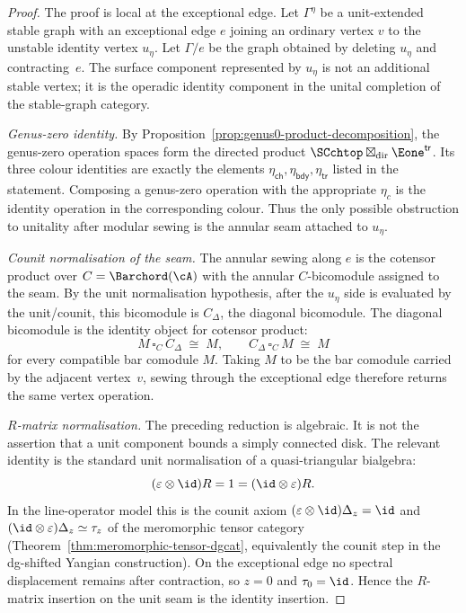 \begin{proof}
The proof is local at the exceptional edge.  Let \(\Gamma^\eta\) be a
unit-extended stable graph with an exceptional edge \(e\) joining an
ordinary vertex \(v\) to the unstable identity vertex \(u_\eta\).
Let \(\Gamma/e\) be the graph obtained by deleting \(u_\eta\) and
contracting~\(e\).  The surface component represented by \(u_\eta\)
is not an additional stable vertex; it is the operadic identity
component in the unital completion of the stable-graph category.

\medskip\noindent
\emph{Genus-zero identity.}
By Proposition~\ref{prop:genus0-product-decomposition}, the
genus-zero operation spaces form the directed product
\(\SCchtop\boxtimes_{\mathrm{dir}}\Eone^{\mathsf{tr}}\).  Its three
colour identities are exactly the elements
\(\eta_{\mathsf{ch}},\eta_{\mathsf{bdy}},\eta_{\mathsf{tr}}\)
listed in the statement.  Composing a genus-zero operation with the
appropriate \(\eta_c\) is the identity operation in the corresponding
colour.  Thus the only possible obstruction to unitality after modular
sewing is the annular seam attached to \(u_\eta\).

\medskip\noindent
\emph{Counit normalisation of the seam.}
The annular sewing along \(e\) is the cotensor product over
\(C=\Barchord(\cA)\) with the annular \(C\)-bicomodule assigned to
the seam.  By the unit normalisation hypothesis, after the \(u_\eta\)
side is evaluated by the unit/counit, this bicomodule is
\(C_\Delta\), the diagonal bicomodule.  The diagonal bicomodule is the
identity object for cotensor product:
\[
 M \,\square_C\, C_\Delta \;\cong\; M,\qquad
 C_\Delta\,\square_C\, M \;\cong\; M
\]
for every compatible bar comodule \(M\).  Taking \(M\) to be the bar
comodule carried by the adjacent vertex~\(v\), sewing through the
exceptional edge therefore returns the same vertex operation.

\medskip\noindent
\emph{\(R\)-matrix normalisation.}
The preceding reduction is algebraic.  It is not the assertion that a
unit component bounds a simply connected disk.  The relevant identity
is the standard unit normalisation of a quasi-triangular bialgebra:
\[
(\varepsilon\otimes\id)R=1=(\id\otimes\varepsilon)R .
\]
In the line-operator model this is the counit axiom
\((\varepsilon\otimes\id)\Delta_z=\id\) and
\((\id\otimes\varepsilon)\Delta_z\simeq\tau_z\)
of the meromorphic tensor category
(Theorem~\ref{thm:meromorphic-tensor-dgcat}, equivalently the
counit step in the dg-shifted Yangian construction).  On the
exceptional edge no spectral displacement remains after contraction,
so \(z=0\) and \(\tau_0=\id\).  Hence the \(R\)-matrix insertion on
the unit seam is the identity insertion.


\end{proof}
